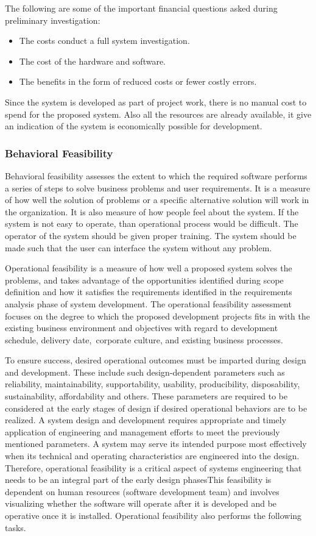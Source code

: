 The following are some of the important financial questions asked during preliminary investigation:
\begin{itemize}
	\item The costs conduct a full system investigation.
	\item The cost of the hardware and software.
	\item The benefits in the form of reduced costs or fewer costly errors.
\end{itemize}

Since the system is developed as part of project work, there is no manual cost to spend for the proposed system. Also all the resources are already available, it give an indication of the system is economically possible for development.

\subsubsection{Behavioral Feasibility}
Behavioral feasibility assesses the extent to which the required software performs a series of steps to solve business problems and user requirements. It is a measure of how well the solution of problems or a specific alternative solution will work in the organization. It is also measure of how people feel about the system. If the system is not easy to operate, than operational process would be difficult. The operator of the system should be given proper training. The system should be made such that the user can interface the system without any problem.

Operational feasibility is a measure of how well a proposed system solves the problems, and takes advantage of the opportunities identified during scope definition and how it satisfies the requirements identified in the requirements analysis phase of system development. The operational feasibility assessment focuses on the degree to which the proposed development projects fits in with the existing business environment and objectives with regard to development schedule, delivery date, corporate culture, and existing business processes.

To ensure success, desired operational outcomes must be imparted during design and development. These include such design-dependent parameters such as reliability, maintainability, supportability, usability, producibility, disposability, sustainability, affordability and others. These parameters are required to be considered at the early stages of design if desired operational behaviors are to be realized. A system design and development requires appropriate and timely application of engineering and management efforts to meet the previously mentioned parameters. A system may serve its intended purpose most effectively when its technical and operating characteristics are engineered into the design. Therefore, operational feasibility is a critical aspect of systems engineering that needs to be an integral part of the early design phasesThis feasibility is dependent on human resources (software development team) and involves visualizing whether the software will operate after it is developed and be operative once it is installed. Operational feasibility also performs the following tasks.

